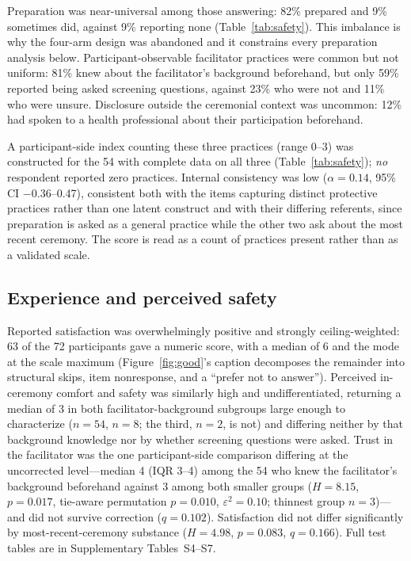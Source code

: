 \documentclass[12pt]{article}
\begin{document}
Preparation was near-universal among those answering: 82\% prepared and 9\% sometimes did, against 9\%
reporting none (Table~\ref{tab:safety}). This imbalance is why the four-arm design was abandoned and it
constrains every preparation analysis below. Participant-observable facilitator practices were common but
not uniform: 81\% knew about the facilitator's background beforehand, but only 59\% reported being asked
screening questions, against 23\% who were not and 11\% who were unsure. Disclosure outside the ceremonial
context was uncommon: 12\% had spoken to a health professional about their participation beforehand.

A participant-side index counting these three practices (range 0--3) was constructed for the 54 with
complete data on all three (Table~\ref{tab:safety}); \emph{no} respondent reported zero practices. Internal
consistency was low ($\alpha = 0.14$, 95\% CI $-0.36$--0.47), consistent both with the items
capturing distinct protective practices rather than one latent construct and with their differing
referents, since preparation is asked as a general practice while the other two ask about the most recent
ceremony. The score is read as a count of practices present rather than as a validated scale.

\subsection{Experience and perceived safety}

Reported satisfaction was overwhelmingly positive and strongly ceiling-weighted: 63 of the 72 participants
gave a numeric score, with a median of 6 and the mode at the scale maximum (Figure~\ref{fig:good}'s caption
decomposes the remainder into structural skips, item nonresponse, and a ``prefer not to answer''). Perceived in-ceremony comfort and safety was similarly high and undifferentiated, returning a median of 3 in
both facilitator-background subgroups large enough to characterize ($n=54$, $n=8$; the third, $n=2$, is not)
and differing neither by that background knowledge nor by whether screening questions were asked.
Trust in the facilitator was the one participant-side comparison differing at the uncorrected
level---median 4 (IQR 3--4) among the 54 who knew the facilitator's background beforehand against 3 among
both smaller groups ($H=8.15$, $p=0.017$, tie-aware permutation $p=0.010$, $\varepsilon^2=0.10$; thinnest group $n=3$)---and did
not survive correction ($q=0.102$). Satisfaction did not differ significantly by most-recent-ceremony substance ($H=4.98$,
$p=0.083$, $q=0.166$). Full test tables are in Supplementary Tables~S4--S7.
\end{document}
